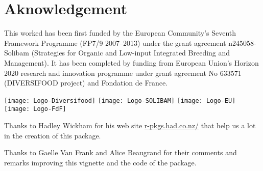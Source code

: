 \section*{Aknowledgement} 
This worked has been first funded by the European Community’s Seventh Framework Programme (FP7/9 2007–2013) under the grant agreement n245058-Solibam (Strategies for Organic and Low-input Integrated Breeding and Management).
It has been completed by funding from European Union’s Horizon 2020 research and innovation programme under grant agreement No 633571 (DIVERSIFOOD project) and Fondation de France.


\begin{center}
\texttt{[image: Logo-Diversifood]} \hspace{.5cm}
\texttt{[image: Logo-SOLIBAM]} \hspace{.5cm}
\texttt{[image: Logo-EU]} \hspace{.5cm}
\texttt{[image: Logo-FdF]}
\end{center}

Thanks to Hadley Wickham for his web site \url{r-pkgs.had.co.nz/} that help us a lot in the creation of this package.

Thanks to Gaelle Van Frank and Alice Beaugrand for their comments and remarks improving this vignette and the code of the package.


